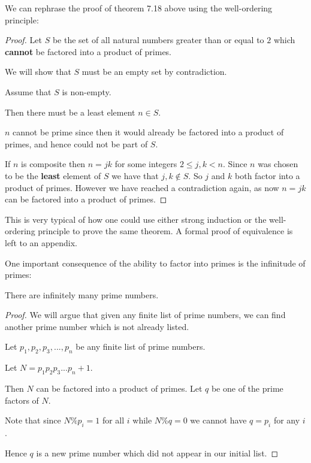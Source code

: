 We can rephrase the proof of theorem 7.18 above using the well-ordering principle:

\begin{proof}
	Let $S$ be the set of all natural numbers greater than or equal to $2$ which \textbf{cannot} be factored into a product of primes.
	
	We will show that $S$ must be an empty set by contradiction.
	
	Assume that $S$ is non-empty.
	
	Then there must be a least element $n \in S$.
	
	$n$ cannot be prime since then it would already be factored into a product of primes, and hence could not be part of $S$.
	
	If $n$ is composite then $n = jk$ for some integers $2 \leq j,k < n$.  Since $n$ was chosen to be the \textbf{least} element of $S$ we have that $j,k \notin S$.  So $j$ and $k$ both factor into a product of primes.  However we have reached a contradiction again, as now $n = jk$ can be factored into a product of primes.
	\end{proof}

This is very typical of how one could use either strong induction or the well-ordering principle to prove the same theorem.  A formal proof of equivalence is left to an appendix.

One important consequence of the ability to factor into primes is the infinitude of primes:

\begin{theorem}
	There are infinitely many prime numbers.
	\end{theorem}

\begin{proof}
	
		We will argue that given any finite list of prime numbers, we can find another prime number which is not already listed.
		
		Let $p_1,p_2, p_3, ..., p_n$ be any finite list of prime numbers.
		
		Let $N = p_1p_2p_3...p_n + 1$.
		
		Then $N$ can be factored into a product of primes.  Let $q$ be one of the prime factors of $N$.
		
		Note that since $N \% p_i = 1$ for all $i$ while $N \% q = 0$ we cannot have $q = p_i$ for any $i$.
		
		Hence $q$ is a new prime number which did not appear in our initial list.
	\end{proof}

